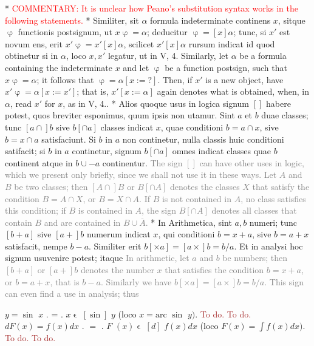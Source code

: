 \documentclass{book}
\newcommand{\s}{\switchcolumn} %
\newcommand{\smallIn}{\ensuremath{\mathrel{\epsilon}}}
\newcommand\irrelavent[1]{\textcolor{gray}{#1}}
\newcommand\commentary[1]{\textcolor{red}{COMMENTARY: #1}}
\newcommand\todo{\textcolor{brown}{To do.}}
\newenvironment{translateTwoCol}
               { %
                 \columnratio{0.5, 0.5} \begin{paracol}{2}
                 \newcommand{\LAT}{\switchcolumn[0]*}
                 \newcommand{\ENG}{\switchcolumn[1]}
               }
               { %
                 \let\ENG\undefined
                 \let\LAT\undefined
                 \end{paracol}
               }
\begin{document}
\begin{translateTwoCol}
\LAT
\ENG
\commentary{It is unclear how Peano's substitution syntax works in the following statements.} 
\LAT
Similiter, sit $\alpha$ formula indeterminate continens $x$, sitque $\upvarphi$ functionis postsignum, ut $x \upvarphi = \alpha$; deducitur $\upvarphi = [x] \alpha$; tunc, si $x'$ est novum ens, erit $x' \upvarphi = x' [x] \alpha$, scilicet $x' [x] \alpha$ rursum indicat id quod obtinetur si in $\alpha$, loco $x, x'$ legatur, ut in V, 4.
\ENG
Similarly, let $\alpha$ be a formula containing the indeterminate $x$ and let $\upvarphi$ be a function postsign, such that $x\upvarphi = \alpha$; it follows that $\upvarphi = \alpha[x := ?]$. Then, if $x'$ is a new object, have $x' \upvarphi = \alpha[x := x']$; that is, $x'[x := \alpha]$ again denotes what is obtained, when, in $\alpha$, read $x'$ for $x$, as in V, 4..
\LAT
Alios quoque usus in logica signum $[ ]$ habere potest, quos breviter esponimus, quum ipsis non utamur. Sint $a$ et $b$ duae classes; tunc $[a \cap ]b$ sive $b[ \cap a]$ classes indicat $x$, quae conditioni $b = a \cap x$, sive $b = x \cap a$ satisfaciunt. Si $b$ in $a$ non continetur, nulla classis huic conditioni satifacit; si $b$ in $a$ continetur, signum $b [ \cap a ]$ omnes indicat classes quae $b$ continent atque in $b \cup - a$ continentur.
\ENG
\irrelavent{The sign $[ ]$ can have other uses in logic, which we present only briefly, since we shall not use it in these ways. Let $A$ and $B$ be two classes; then $[A \cap ]B$ or $B[ \cap A]$ denotes the classes $X$ that satisfy the condition $B = A \cap X$, or $B = X \cap A$. If $B$ is not contained in $A$, no class satisfies this condition; if $B$ is contained in $A$, the sign $B [ \cap A ]$ denotes all classes that contain $B$ and are contained in $B \cup  \overline{A}$.}
\LAT
In Arithmetica, sint $a, b$ numeri; tunc $[b + a]$ sive $[a +] b$ numerum indicat $x$, qui conditioni $b = x + a$, sive $b = a + x$ satisfacit, nempe $b - a$. Similiter erit $b [ \times a ] = [a \times ] b = b / a$. Et in analysi hoc signum usuvenire potest; itaque
\ENG
\irrelavent{In arithmetic, let $a$ and $b$ be numbers; then $[b + a]$ or $[a +] b$ denotes the number $x$ that satisfies the condition $b = x + a$, or $b = a + x$, that is $b - a$. Similarly we have $b [ \times a ] = [a \times ] b = b / a$. This sign can even find a use in analysis; thus}
\end{translateTwoCol}

\begin{paracol}{4}
\hspace{0.54cm} $y = \sin$ $x$ $.$ = $.$ $x \smallIn$ $[\sin]$ $y$
\s
(loco $x = \mbox{arc}$ $\sin$ $y).$
\s
\todo
\s
\todo
\s
\hspace{0.54cm} $d F (x) = f(x) dx$ $.$ $=$ $.$ $F$ $(x)\smallIn$ $[d]$ $f(x)dx$
\s
(loco $F(x) = \int{f(x)dx}).$ 
\s
\todo
\s
\todo
\end{paracol}
\end{document}
